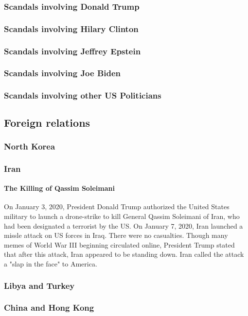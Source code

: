 			\subsubsection{Scandals involving Donald Trump}
			\subsubsection{Scandals involving Hilary Clinton}
			\subsubsection{Scandals involving Jeffrey Epstein}
			\subsubsection{Scandals involving Joe Biden}
			\subsubsection{Scandals involving other US Politicians}

		\subsection{Foreign relations}	
			\subsubsection{North Korea}
			\subsubsection{Iran}
				\paragraph{The Killing of Qassim Soleimani}
				On January 3, 2020, President Donald Trump authorized the United States military to launch a drone-strike to kill General Qassim Soleimani of Iran, who had been designated a terrorist by the US.  On January 7, 2020, Iran launched a missle attack on US forces in Iraq.  There were no casualties.  Though many memes of World War III beginning circulated online, President Trump stated that after this attack, Iran appeared to be standing down.  Iran called the attack a "slap in the face" to America.  
			\subsubsection{Libya and Turkey}
			\subsubsection{China and Hong Kong}
